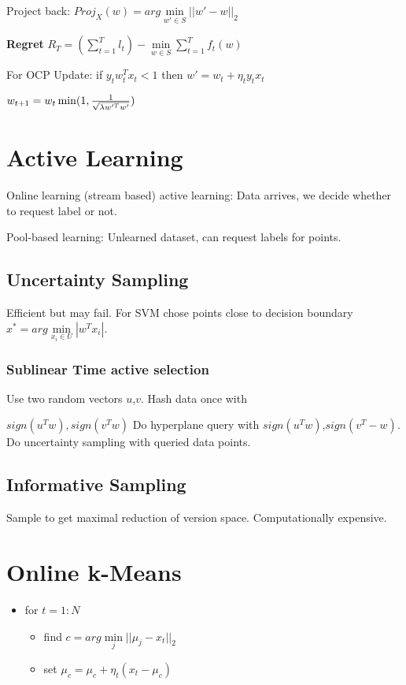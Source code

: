\documentclass[a4paper,11pt,twocolumn]{article}
\begin{document}
Project back: $Proj_X(w) = arg \min \limits_{w' \in S} ||w' - w||_2$

\textbf{Regret} $R_T = (\sum \limits_{t=1}^T l_t) - \min \limits_{w \in S} \sum \limits_{t=1}^T f_t(w)$

For OCP Update: if $y_t w_t^T x_t < 1$ then 
$w'=w_t+\eta_t y_t x_t$

$w_{t+1} = w_t \min (1,{{1}\over{\sqrt{\lambda w'^T w'}}})$


\section{Active Learning}
Online learning (stream based) active learning: Data arrives, we decide whether to request label or not.

Pool-based learning: Unlearned dataset, can request labels for points.

\subsection{Uncertainty Sampling}
Efficient but may fail. For SVM chose points close to decision boundary $x^* = arg \min \limits_{x_i \in U} |w^T x_i| $. 

\subsubsection{Sublinear Time active selection}
Use two random vectors $u$,$v$. Hash data once with 

$sign(u^T w), sign(v^T w)$ Do hyperplane query with $sign(u^Tw)$,$sign(v^T -w)$. Do uncertainty sampling with queried data points.

\subsection{Informative Sampling}
Sample to get maximal reduction of version space. Computationally expensive.


\section{Online k-Means}
\begin{itemize}[noitemsep,topsep=0pt,parsep=0pt,partopsep=0pt]
\item for $t=1:N$
\begin{itemize}[noitemsep,topsep=0pt,parsep=0pt,partopsep=0pt]
\item find $c = arg \min \limits_j ||\mu_j - x_t ||_2$
\item set $ \mu_c = \mu_c+ \eta_t ( x_t - \mu_c)$
\end{itemize}
\end{itemize}
\end{document}
